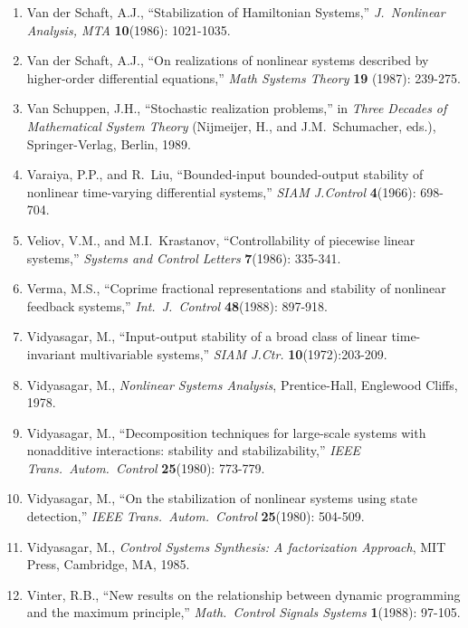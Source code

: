 \begin{enumerate}
\item
Van der Schaft, A.J., ``Stabilization of Hamiltonian Systems,'' {\it J.\
Nonlinear Analysis, MTA} {\bf 10}(1986): 1021-1035.

\item
Van der Schaft, A.J., ``On realizations of nonlinear systems described by
higher-order differential equations,'' {\it Math Systems Theory} {\bf 19}
(1987): 239-275.

\item
Van Schuppen, J.H., ``Stochastic realization problems,'' in {\it Three Decades
of Mathematical System Theory} (Nijmeijer, H., and J.M.\ Schumacher, eds.),
Springer-Verlag, Berlin, 1989.

\item
Varaiya, P.P., and R.\ Liu, ``Bounded-input bounded-output stability of
nonlinear time-varying differential systems,'' {\it SIAM J.Control} {\bf
4}(1966): 698-704.

\item
Veliov, V.M., and M.I.\ Krastanov, ``Controllability of piecewise linear
systems,'' {\it Systems and Control Letters} {\bf 7}(1986): 335-341.

\item
Verma, M.S., ``Coprime fractional representations and stability of nonlinear
feedback systems,'' {\it Int.\ J.\ Control} {\bf 48}(1988): 897-918.

\item
Vidyasagar, M., ``Input-output stability of a broad class of linear
time-invariant multivariable systems,'' {\it SIAM J.Ctr.}{\bf
10}(1972):203-209.

\item
Vidyasagar, M., {\it Nonlinear Systems Analysis}, Prentice-Hall, Englewood
Cliffs, 1978.

\item
Vidyasagar, M., ``Decomposition techniques for large-scale systems with
nonadditive interactions: stability and stabilizability,'' {\it IEEE Trans.\
Autom.\ Control} {\bf 25}(1980): 773-779.

\item
Vidyasagar, M., ``On the stabilization of nonlinear systems using state
detection,'' {\it IEEE Trans.\ Autom.\ Control} {\bf 25}(1980): 504-509.

\item
Vidyasagar, M., {\it Control Systems Synthesis: A factorization Approach}, MIT
Press, Cambridge, MA, 1985.

\item
Vinter, R.B., ``New results on the relationship between dynamic programming
and the maximum principle,'' {\it Math.\ Control Signals Systems} {\bf
1}(1988): 97-105.


\end{enumerate}
